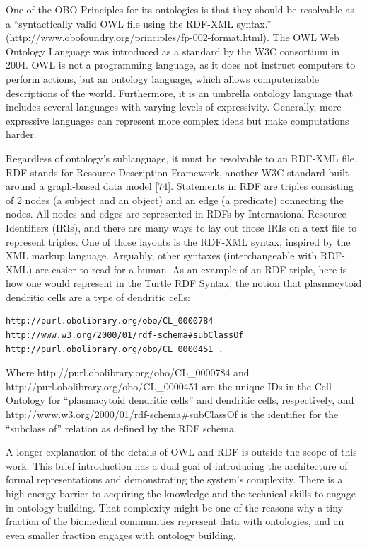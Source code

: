 One of the OBO Principles for its ontologies is that they should be resolvable as a ``syntactically valid OWL file using the RDF-XML syntax.'' (http://www.obofoundry.org/principles/fp-002-format.html).
The OWL Web Ontology Language was introduced as a standard by the W3C consortium in 2004.
OWL is not a programming language, as it does not instruct computers to perform actions, but an ontology language, which allows computerizable descriptions of the world.
Furthermore, it is an umbrella ontology language that includes several languages with varying levels of expressivity.
Generally, more expressive languages can represent more complex ideas but make computations harder.

Regardless of ontology's sublanguage, it must be resolvable to an RDF-XML file.
RDF stands for Resource Description Framework, another W3C standard built around a graph-based data model {[}\protect\hyperlink{ref-djVboz3w}{74}{]}.
Statements in RDF are triples consisting of 2 nodes (a subject and an object) and an edge (a predicate) connecting the nodes.
All nodes and edges are represented in RDFs by International Resource Identifiers (IRIs), and there are many ways to lay out those IRIs on a text file to represent triples.
One of those layouts is the RDF-XML syntax, inspired by the XML markup language.
Arguably, other syntaxes (interchangeable with RDF-XML) are easier to read for a human.
As an example of an RDF triple, here is how one would represent in the Turtle RDF Syntax, the notion that plasmacytoid dendritic cells are a type of dendritic cells:

\begin{verbatim}
http://purl.obolibrary.org/obo/CL_0000784  http://www.w3.org/2000/01/rdf-schema#subClassOf  http://purl.obolibrary.org/obo/CL_0000451 .
\end{verbatim}

Where http://purl.obolibrary.org/obo/CL\_0000784 and http://purl.obolibrary.org/obo/CL\_0000451 are the unique IDs in the Cell Ontology for ``plasmacytoid dendritic cells'' and dendritic cells, respectively, and http://www.w3.org/2000/01/rdf-schema\#subClassOf is the identifier for the ``subclass of'' relation as defined by the RDF schema.

A longer explanation of the details of OWL and RDF is outside the scope of this work.
This brief introduction has a dual goal of introducing the architecture of formal representations and demonstrating the system's complexity.
There is a high energy barrier to acquiring the knowledge and the technical skills to engage in ontology building.
That complexity might be one of the reasons why a tiny fraction of the biomedical communities represent data with ontologies, and an even smaller fraction engages with ontology building.

